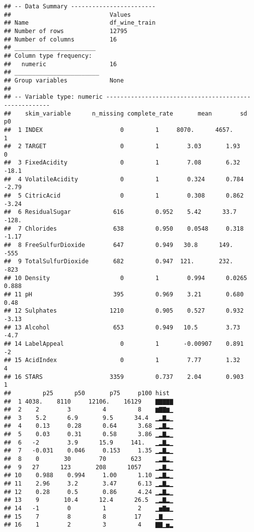 \documentclass[
]{article}
\begin{document}
\begin{verbatim}
## -- Data Summary ------------------------
##                            Values       
## Name                       df_wine_train
## Number of rows             12795        
## Number of columns          16           
## _______________________                 
## Column type frequency:                  
##   numeric                  16           
## ________________________                
## Group variables            None         
## 
## -- Variable type: numeric ------------------------------------------------------
##    skim_variable      n_missing complete_rate       mean        sd       p0
##  1 INDEX                      0         1     8070.      4657.        1    
##  2 TARGET                     0         1        3.03       1.93      0    
##  3 FixedAcidity               0         1        7.08       6.32    -18.1  
##  4 VolatileAcidity            0         1        0.324      0.784    -2.79 
##  5 CitricAcid                 0         1        0.308      0.862    -3.24 
##  6 ResidualSugar            616         0.952    5.42      33.7    -128.   
##  7 Chlorides                638         0.950    0.0548     0.318    -1.17 
##  8 FreeSulfurDioxide        647         0.949   30.8      149.     -555    
##  9 TotalSulfurDioxide       682         0.947  121.       232.     -823    
## 10 Density                    0         1        0.994      0.0265    0.888
## 11 pH                       395         0.969    3.21       0.680     0.48 
## 12 Sulphates               1210         0.905    0.527      0.932    -3.13 
## 13 Alcohol                  653         0.949   10.5        3.73     -4.7  
## 14 LabelAppeal                0         1       -0.00907    0.891    -2    
## 15 AcidIndex                  0         1        7.77       1.32      4    
## 16 STARS                   3359         0.737    2.04       0.903     1    
##         p25      p50       p75     p100 hist 
##  1 4038.    8110     12106.    16129    ▇▇▇▇▇
##  2    2        3         4         8    ▆▇▇▆▁
##  3    5.2      6.9       9.5      34.4  ▁▂▇▂▁
##  4    0.13     0.28      0.64      3.68 ▁▂▇▂▁
##  5    0.03     0.31      0.58      3.86 ▁▂▇▂▁
##  6   -2        3.9      15.9     141.   ▁▂▇▂▁
##  7   -0.031    0.046     0.153     1.35 ▁▂▇▂▁
##  8    0       30        70       623    ▁▂▇▂▁
##  9   27      123       208      1057    ▁▂▇▂▁
## 10    0.988    0.994     1.00      1.10 ▁▂▇▂▁
## 11    2.96     3.2       3.47      6.13 ▁▂▇▂▁
## 12    0.28     0.5       0.86      4.24 ▁▂▇▂▁
## 13    9       10.4      12.4      26.5  ▁▂▇▂▁
## 14   -1        0         1         2    ▁▅▇▅▁
## 15    7        8         8        17    ▁▇▁▁▁
## 16    1        2         3         4    ▇▇▁▅▂
\end{verbatim}
\end{document}
